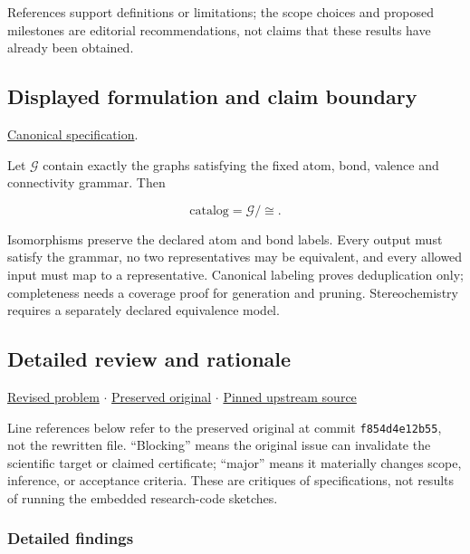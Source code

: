 \documentclass[
  11pt,
]{article}
\begin{document}
References support definitions or limitations; the scope choices and
proposed milestones are editorial recommendations, not claims that these
results have already been obtained.

\subsection{Displayed formulation and claim boundary}

\href{https://github.com/rick-stevens-ai/Pure-Thought/blob/main/PRDs/17-Isomer-Enumeration-Molecular-Graphs.md}{Canonical
specification}.

Let \(\mathcal G\) contain exactly the graphs satisfying the fixed atom,
bond, valence and connectivity grammar. Then

\[\text{catalog}=\mathcal G/\!\cong.\]

Isomorphisms preserve the declared atom and bond labels. Every output
must satisfy the grammar, no two representatives may be equivalent, and
every allowed input must map to a representative. Canonical labeling
proves deduplication only; completeness needs a coverage proof for
generation and pruning. Stereochemistry requires a separately declared
equivalence model.

\subsection{Detailed review and rationale}

\href{https://github.com/rick-stevens-ai/Pure-Thought/blob/main/PRDs/17-Isomer-Enumeration-Molecular-Graphs.md}{Revised
problem} \ensuremath{\cdot}
\href{https://github.com/rick-stevens-ai/Pure-Thought/blob/main/archive/original-PRDs/17-Isomer-Enumeration-Molecular-Graphs.md}{Preserved
original} \ensuremath{\cdot}
\href{https://github.com/rick-stevens-ai/Pure-Thought/blob/f854d4e12b55c1f5b5c2a964b75f2d23496d981e/PRDs/17-Isomer-Enumeration-Molecular-Graphs.md}{Pinned
upstream source}

Line references below refer to the preserved original at commit
\texttt{f854d4e12b55}, not the rewritten file. ``Blocking'' means the
original issue can invalidate the scientific target or claimed
certificate; ``major'' means it materially changes scope, inference, or
acceptance criteria. These are critiques of specifications, not results
of running the embedded research-code sketches.

\subsubsection{Detailed findings}
\end{document}
